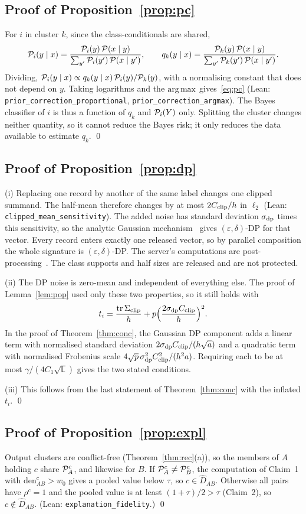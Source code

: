 \subsection{Proof of Proposition~\ref{prop:pc}}
For $i$ in cluster $k$, since the class-conditionals are shared,
\[
\mathcal{P}_i(y\mid x)=\frac{\mathcal{P}_i(y)\,\mathcal{P}(x\mid y)}{\sum_{y'}\mathcal{P}_i(y')\,\mathcal{P}(x\mid y')},
\qquad
q_k(y\mid x)=\frac{\mathcal{P}_k(y)\,\mathcal{P}(x\mid y)}{\sum_{y'}\mathcal{P}_k(y')\,\mathcal{P}(x\mid y')}.
\]
Dividing, $\mathcal{P}_i(y\mid x)\propto q_k(y\mid x)\,\mathcal{P}_i(y)/\mathcal{P}_k(y)$, with a normalising constant that does not depend on $y$. Taking logarithms and the $\operatorname*{arg\,max}$ gives~\eqref{eq:pc} (Lean: \texttt{prior\_correction\_proportional}, \texttt{prior\_correction\_argmax}). The Bayes classifier of $i$ is thus a function of $q_k$ and $\mathcal{P}_i(Y)$ only. Splitting the cluster changes neither quantity, so it cannot reduce the Bayes risk; it only reduces the data available to estimate $q_k$. \qed

\subsection{Proof of Proposition~\ref{prop:dp}}
(i) Replacing one record by another of the same label changes one clipped summand. The half-mean therefore changes by at most $2C_{\rm clip}/h$ in $\ell_2$ (Lean: \texttt{clipped\_mean\_sensitivity}). The added noise has standard deviation $\sigma_{\rm dp}$ times this sensitivity, so the analytic Gaussian mechanism~\citep{balle2018analytic} gives $(\varepsilon,\delta)$-DP for that vector. Every record enters exactly one released vector, so by parallel composition the whole signature is $(\varepsilon,\delta)$-DP. The server's computations are post-processing~\citep{dwork2014dp}. The class supports and half sizes are released and are not protected.

(ii) The DP noise is zero-mean and independent of everything else. The proof of Lemma~\ref{lem:pop} used only these two properties, so it still holds with
\[
t_i=\frac{\operatorname{tr}\Sigma_{\rm clip}}{h}+p\Big(\frac{2\sigma_{\rm dp}C_{\rm clip}}{h}\Big)^2.
\]
In the proof of Theorem~\ref{thm:conc}, the Gaussian DP component adds a linear term with normalised standard deviation $2\sigma_{\rm dp}C_{\rm clip}/(h\sqrt a)$ and a quadratic term with normalised Frobenius scale $4\sqrt p\,\sigma^2_{\rm dp}C^2_{\rm clip}/(h^2a)$. Requiring each to be at most $\gamma/(4C_1\sqrt{\mathsf L})$ gives the two stated conditions.

(iii) This follows from the last statement of Theorem~\ref{thm:conc} with the inflated $t_i$. \qed

\subsection{Proof of Proposition~\ref{prop:expl}}
Output clusters are conflict-free (Theorem~\ref{thm:rec}(a)), so the members of $A$ holding $c$ share $\mathcal{P}_A^c$, and likewise for $B$. If $\mathcal{P}_A^c\neq\mathcal{P}_B^c$, the computation of Claim~1 with $\mathrm{den}^c_{AB}>w_0$ gives a pooled value below $\tau$, so $c\in\hat D_{AB}$. Otherwise all pairs have $\rho^c=1$ and the pooled value is at least $(1+\tau)/2>\tau$ (Claim~2), so $c\notin\hat D_{AB}$. (Lean: \texttt{explanation\_fidelity}.) \qed
